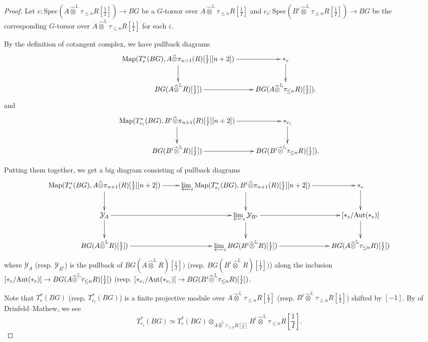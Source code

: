 \documentclass[10pt]{article}
\numberwithin{equation}{section}
\newcommand{\bL}{{\mathbb L}}
\newcommand{\calY}{{\mathcal Y}}
\newcommand{\Map}{\mathrm{Map}}
\newcommand{\Spec}{{\mathrm{Spec}}}         %
\begin{document}
\begin{proof}
    Let $e:\Spec(A\widehat\otimes^{\bL}\tau_{\leq n}R[\frac{1}{I}])\to BG$ be a $G$-torsor over $A\widehat\otimes^{\bL}\tau_{\leq n}R[\frac{1}{I}]$ and $e_i:\Spec(B^i\widehat\otimes^{\bL}\tau_{\leq n}R[\frac{1}{I}])\to BG$ be the corresponding $G$-torsor over $A\widehat\otimes^{\bL}\tau_{\leq n}R[\frac{1}{I}]$ for each $i$.


By the definition of cotangent complex, we have pullback diagrams
\begin{equation}
    \xymatrix{
    \Map(T^*_e(BG),A\widehat\otimes\pi_{n+1}(R)[\frac{1}{I}][n+2])\ar[r]\ar[d]& {*}_e\ar[d]\\
    BG(A\widehat\otimes^{\bL} R)[\frac{1}{I}])\ar[r]& BG(A\widehat\otimes^{\bL} \tau_{\leq n}R)[\frac{1}{I}]).
    }
\end{equation}
and
\begin{equation}
    \xymatrix{
    \Map(T^*_{e_i}(BG),B^i\widehat\otimes\pi_{n+1}(R)[\frac{1}{I}][n+2])\ar[r]\ar[d]& {*}_{e_i}\ar[d]\\
    BG(B^i\widehat\otimes^{\bL} R)[\frac{1}{I}])\ar[r]& BG(B^i\widehat\otimes^{\bL} \tau_{\leq n}R)[\frac{1}{I}]).
    }
\end{equation}

Putting them together, we get a big diagram consisting of pullback diagrams
\begin{equation*}
    \xymatrix{
    \Map(T^*_e(BG),A\widehat\otimes\pi_{n+1}(R)[\frac{1}{I}][n+2])\ar[r]\ar[d]& \varprojlim_i\Map(T^*_{e_i}(BG),B^i\widehat\otimes\pi_{n+1}(R)[\frac{1}{I}][n+2])\ar[r]\ar[d] & {*}_e\ar[d]\\
    \calY_A\ar[r]\ar[d] & \varprojlim_i\calY_{B^i}\ar[r]\ar[d] & [*_e/{\Aut(*_e)}]\ar[d]\\
    BG(A\widehat\otimes^{\bL} R)[\frac{1}{I}])\ar[r]& \varprojlim_iBG(B^i\widehat\otimes^{\bL} R)[\frac{1}{I}])\ar[r]& BG(A\widehat\otimes^{\bL} \tau_{\leq n}R)[\frac{1}{I}])
    }
\end{equation*}
where $\calY_A$ (resp. $\calY_{B^i}$) is the pullback of $BG(A\widehat\otimes^{\bL} R)[\frac{1}{I}])$ (resp. $BG(B^i\widehat\otimes^{\bL} R)[\frac{1}{I}])$) along the inclusion $[*_e/{\Aut(*_e)}]\to BG(A\widehat\otimes^{\bL} \tau_{\leq n}R)[\frac{1}{I}])$ (resp. $[*_{e_i}/{\Aut(*_{e_i})}]\to BG(B^i\widehat\otimes^{\bL} \tau_{\leq n}R)[\frac{1}{I}])$.

Note that $T^*_e(BG)$ (resp. $T^*_{e_i}(BG)$) is a finite projective module over $A\widehat\otimes^{\bL} \tau_{\leq n}R[\frac{1}{I}]$ (resp. $B^i\widehat\otimes^{\bL}\tau_{\leq n}R[\frac{1}{I}]$) shifted by $[-1]$. By \cite[Theorem 2.4]{Min23} of Drinfeld--Mathew, we see
\[
T^*_{e_i}(BG)\simeq T^*_e(BG)\otimes_{A\widehat\otimes^{\bL} \tau_{\leq n}R[\frac{1}{I}]}B^i\widehat\otimes^{\bL}\tau_{\leq n}R[\frac{1}{I}].
\]


\end{proof}
\end{document}

